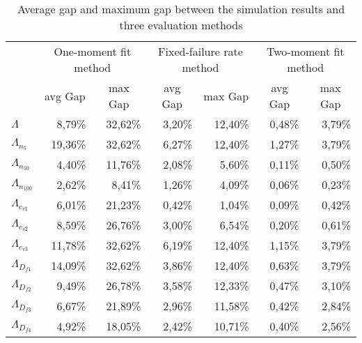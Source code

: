 \documentclass[preprint,12pt]{elsarticle}
\begin{document}
\begin{table}[htbp]
  \centering
    \caption{Average gap and maximum gap between the simulation results and three evaluation methods}
    \begin{tabular}{lrrrrrr}
    \toprule
    & \multicolumn{2}{c}{One-moment fit method} & \multicolumn{2}{c}{Fixed-failure rate method} & \multicolumn{2}{c}{Two-moment fit method}  \\
    & \multicolumn{1}{c}{avg Gap} & \multicolumn{1}{c}{max Gap} & \multicolumn{1}{c}{avg Gap} & \multicolumn{1}{c}{max Gap} & \multicolumn{1}{c}{avg Gap} & \multicolumn{1}{c}{max Gap} \\
    \midrule
    $\Lambda$ & 8,79\% & 32,62\% & 3,20\% & 12,40\% & 0,48\% & 3,79\% \\
    $\Lambda_{n_{5}}$ & 19,36\% & 32,62\% & 6,27\% & 12,40\% & 1,27\% & 3,79\% \\
    $\Lambda_{n_{50}}$  & 4,40\% & 11,76\% & 2,08\% & 5,60\% & 0,11\% & 0,50\% \\
    $\Lambda_{n_{100}}$  & 2,62\% & 8,41\% & 1,26\% & 4,09\% & 0,06\% & 0,23\% \\
    $\Lambda_{c_{v1}}$ & 6,01\% & 21,23\% & 0,42\% & 1,04\% & 0,09\% & 0,42\% \\
    $\Lambda_{c_{v2}}$ & 8,59\% & 26,76\% & 3,00\% & 6,54\% & 0,20\% & 0,61\% \\
    $\Lambda_{c_{v3}}$& 11,78\% & 32,62\% & 6,19\% & 12,40\% & 1,15\% & 3,79\% \\
    $\Lambda_{D_{f1}}$ & 14,09\% & 32,62\% & 3,86\% & 12,40\% & 0,63\% & 3,79\% \\
    $\Lambda_{D_{f2}}$ & 9,49\% & 26,78\% & 3,58\% & 12,33\% & 0,47\% & 3,10\% \\
    $\Lambda_{D_{f3}}$ & 6,67\% & 21,89\% & 2,96\% & 11,58\% & 0,42\% & 2,84\% \\
    $\Lambda_{D_{f4}}$ & 4,92\% & 18,05\% & 2,42\% & 10,71\% & 0,40\% & 2,56\% \\
    \bottomrule
    \end{tabular}%
  \label{tab:addlabel}%
\end{table}%
\end{document}
